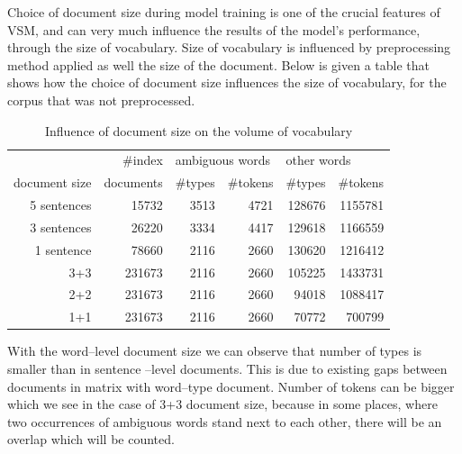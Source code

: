 Choice of document size during model training is one of the crucial features of VSM, and can very much 
influence the results of the model's performance, through the size of vocabulary. Size of vocabulary is 
influenced by 
preprocessing method applied as well the size of the document. Below is given a table that shows how 
the choice of document size influences the size of vocabulary, for the corpus that was not preprocessed. 

\begin{table}[h!]
\begin{tabular}{ r | r | r r | r r }\label{docSize}
			& \#index  & \multicolumn{2}{l|}{ ambiguous  words }& \multicolumn{2}{l|}{ other words }\\
 document size & documents & \#types & \#tokens & \#types & \#tokens \\
\hline
5 sentences & 15732 & 3513 & 4721 & 128676 & 1155781\\
3 sentences & 26220 & 3334 & 4417 & 129618 & 1166559\\
1 sentence & 78660 & 2116 & 2660 & 130620 & 1216412\\
3+3 & 231673 & 2116 & 2660 & 105225 & 1433731\\
2+2 & 231673 & 2116 & 2660 & 94018 & 1088417\\
1+1 & 231673 & 2116 & 2660 & 70772 & 700799\\
\end{tabular}
\caption{Influence of document size on the volume of vocabulary}
\end{table}

With the word--level document size we can observe that number of types is smaller than in sentence
--level documents. This is due to existing gaps between documents in matrix with word--type document.
Number of tokens  can be bigger which we see in the case of 3+3 document size, because in some 
places, where two occurrences of ambiguous words stand next to each other, there will be an overlap
which will be counted. 

